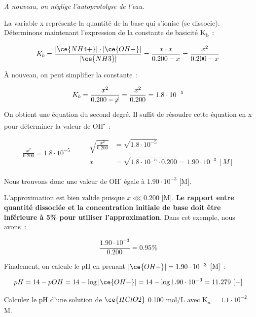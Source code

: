 \documentclass[
  11pt,
  french,
  a4paper,
  openany]{book}
\begin{document}
\emph{A nouveau, on néglige l'autoprotolyse de l'eau.}

La variable x représente la quantité de la base qui s'ionise (se dissocie). Déterminons maintenant l'expression de la constante de basicité K\textsubscript{b}~:

\[
K_b = \frac{|\ce{NH4+}| \cdot |\ce{OH-}|}{|\ce{NH3}|} = \frac{x \cdot x}{0.200 - x} = \frac{x^2}{0.200 - x}
\]

À nouveau, on peut simplifier la constante~:

\[
K_b = \frac{x^2}{0.200 - \cancel{x}} = \frac{x^2}{0.200} = 1.8 \cdot 10^{-5}
\]

On obtient une équation du second degré. Il suffit de résoudre cette équation en x pour déterminer la valeur de \textbar OH\textsuperscript{-}\textbar~:

\[
\begin{split}
\frac{x^2}{0.200} = 1.8 \cdot 10^{-5}
\end{split}
\qquad
\begin{split}
\sqrt{\frac{x^2}{0.200}} &= \sqrt{1.8 \cdot 10^{-5}} \\
x &= \sqrt{1.8 \cdot 10^{-5} \cdot 0.200} = 1.90 \cdot 10^{-3}\ [M]
\end{split}
\]

Nous trouvons donc une valeur de \textbar OH\textsuperscript{-}\textbar{} égale à \(1.90 \cdot 10^{-3}\) {[}M{]}.

L'approximation est bien valide puisque \(x \lll 0.200\) {[}M{]}. \textbf{Le rapport entre quantité dissociée et la concentration initiale de base doit être inférieure à 5\% pour utiliser l'approximation}. Dans cet exemple, nous avons~:

\[
\frac{1.90 \cdot 10^{-3}}{0.200} = 0.95\%
\]

Finalement, on calcule le pH en prenant \(|\ce{OH-}| = 1.90 \cdot 10^{-3}\) {[}M{]}~:

\[
pH = 14 - pOH = 14 - \log |\ce{OH-}| = 14 - \log 1.90 \cdot 10^{-3} = 11.279\ [-]
\]

\begin{Exercise}
Calculez le pH d'une solution de \(\ce{HClO2}\) 0.100 mol/L avec K\textsubscript{a} = \(1.1 \cdot 10^{-2}\) M.

\end{Exercise}
\end{document}
